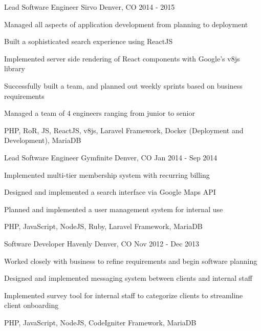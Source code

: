 \begin{cventries}
{    }
  \cventry
    {Lead Software Engineer}
    {Sirvo}
    {Denver, CO}
    {2014 - 2015}
    {
      \begin{cvitems}
        \item {Managed all aspects of application development from planning to deployment}
        \item {Built a sophisticated search experience using ReactJS}
        \item {Implemented server side rendering of React components with Google’s v8js library}
        \item {Successfully built a team, and planned out weekly sprints based on business requirements}
        \item {Managed a team of 4 engineers ranging from junior to senior}
        \item {PHP, RoR, JS, ReactJS, v8js, Laravel Framework, Docker (Deployment and Development), MariaDB}
      \end{cvitems}
    }
  \cventry
    {Lead Software Engineer}
    {Gymfinite}
    {Denver, CO}
    {Jan 2014 - Sep 2014}
    {
      \begin{cvitems}
        \item {Implemented multi-tier membership system with recurring billing}
        \item {Designed and implemented a search interface via Google Maps API}
        \item {Planned and implemented a user management system for internal use}
        \item {PHP, JavaScript, NodeJS, Ruby, Laravel Framework, MariaDB}
      \end{cvitems}
    }
  \cventry
    {Software Developer}
    {Havenly}
    {Denver, CO}
    {Nov 2012 - Dec 2013}
    {
      \begin{cvitems}
        \item {Worked closely with business to refine requirements and begin software planning}
        \item {Designed and implemented messaging system between clients and internal staff}
        \item {Implemented survey tool for internal staff to categorize clients to streamline client onboarding}
        \item {PHP, JavaScript, NodeJS, CodeIgniter Framework, MariaDB}
      \end{cvitems}
    }
\end{cventries}
